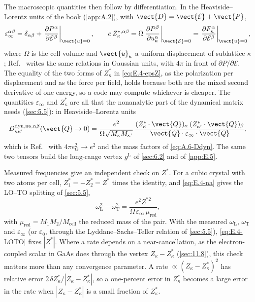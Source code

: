The macroscopic quantities then follow by differentiation. In the Heaviside--Lorentz units of the book (\cref{app:A.2}), with $\vect{D} = \vect{\mathcal{E}} + \vect{P}$,
\begin{equation}
  \varepsilon_\infty^{\alpha\beta} = \delta_{\alpha\beta} + \left.\frac{\partial P^\alpha}{\partial\mathcal{E}^\beta}\right|_{\vect{u} = 0},
  \qquad
  e\,Z^{*,\alpha\beta}_\kappa = \Omega\left.\frac{\partial P^\beta}{\partial u^\alpha_\kappa}\right|_{\vect{\mathcal{E}} = 0}
  = \left.\frac{\partial F^\alpha_\kappa}{\partial\mathcal{E}^\beta}\right|_{\vect{u} = 0} ,
  \label{eq:E.4-epsZ}
\end{equation}
where $\Omega$ is the cell volume and $\vect{u}_\kappa$ a uniform displacement of sublattice $\kappa$; Ref.~\cite[Eqs.~(94)--(96)]{baroni2001phonons} writes the same relations in Gaussian units, with $4\pi$ in front of $\partial P/\partial\mathcal{E}$. The equality of the two forms of $Z^*_\kappa$ in \cref{eq:E.4-epsZ}, as the polarization per displacement and as the force per field, holds because both are the mixed second derivative of one energy, so a code may compute whichever is cheaper. The quantities $\varepsilon_\infty$ and $Z^*_\kappa$ are all that the nonanalytic part of the dynamical matrix needs (\cref{sec:5.5}): in Heaviside--Lorentz units
\begin{equation}
  D^{\mathrm{dyn,na},\alpha\beta}_{\kappa\kappa'}(\vect{Q}\to 0) = \frac{e^2}{\Omega\sqrt{M_\kappa M_{\kappa'}}}\,
  \frac{(Z^*_\kappa\cdot\vect{Q})_\alpha\,(Z^*_{\kappa'}\cdot\vect{Q})_\beta}{\vect{Q}\cdot\varepsilon_\infty\cdot\vect{Q}} ,
  \label{eq:E.4-na}
\end{equation}
which is Ref.~\cite[Eq.~(98)]{baroni2001phonons} with $4\pi e^2_{\mathrm{G}} \to e^2$ and the mass factors of \cref{eq:A.6-Ddyn}. The same two tensors build the long-range vertex $g^{\mathrm{L}}$ of \cref{sec:6.2} and of \cref{app:E.5}.

Measured frequencies give an independent check on $Z^*$. For a cubic crystal with two atoms per cell, $Z^*_1 = -Z^*_2 = Z^*$ times the identity, and \cref{eq:E.4-na} gives the LO--TO splitting of \cref{sec:5.5},
\begin{equation}
  \omega_{\mathrm{L}}^2 - \omega_{\mathrm{T}}^2 = \frac{e^2Z^{*2}}{\Omega\,\varepsilon_\infty\,\mu_{\mathrm{red}}} ,
  \label{eq:E.4-LOTO}
\end{equation}
with $\mu_{\mathrm{red}} = M_1M_2/M_{\mathrm{cell}}$ the reduced mass of the pair. With the measured $\omega_{\mathrm{L}}$, $\omega_{\mathrm{T}}$ and $\varepsilon_\infty$ (or $\varepsilon_0$, through the Lyddane--Sachs--Teller relation of \cref{sec:5.5}), \cref{eq:E.4-LOTO} fixes $|Z^*|$. Where a rate depends on a near-cancellation, as the electron-coupled scalar in GaAs does through the vertex $Z_\kappa - Z^*_\kappa$ (\cref{sec:11.8}), this check matters more than any convergence parameter. A rate $\propto (Z_\kappa - Z^*_\kappa)^2$ has relative error $2\,\delta Z^*_\kappa/|Z_\kappa - Z^*_\kappa|$, so a one-percent error in $Z^*_\kappa$ becomes a large error in the rate when $|Z_\kappa - Z^*_\kappa|$ is a small fraction of $Z^*_\kappa$.

